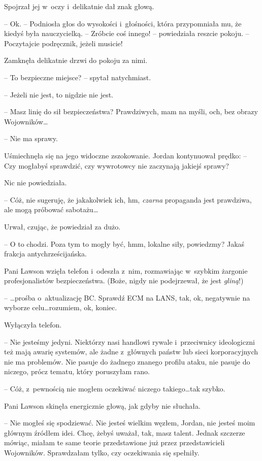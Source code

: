 \documentclass[oneside,polish,11pt,sfheadings]{mwbk}
\begin{document}
Spojrzał jej w~oczy i~delikatnie dał znak głową.

-- Ok. -- Podniosła głos do wysokości i~głośności, która przypomniała mu,
że kiedyś była nauczycielką. -- Zróbcie coś innego! -- powiedziała reszcie
pokoju. -- Poczytajcie podręcznik, jeżeli musicie!

Zamknęła delikatnie drzwi do pokoju za nimi.

-- To bezpieczne miejsce? -- spytał natychmiast.

-- Jeżeli nie jest, to nigdzie nie jest.

-- Masz linię do sił bezpieczeństwa? Prawdziwych, mam na myśli, och, bez
obrazy Wojowników\ldots

-- Nie ma sprawy.

Uśmiechnęła się na jego widoczne zszokowanie. Jordan kontynuował prędko:
-- Czy mogłabyś sprawdzić, czy wywrotowcy nie zaczynają jakiejś sprawy?

Nic nie powiedziała.

-- Cóż, nie sugeruję, że jakakolwiek ich, hm, \emph{czarna} propaganda
jest prawdziwa, ale mogą próbować sabotażu\ldots

Urwał, czując, że powiedział za dużo.

-- O to chodzi. Poza tym to mogły być, hmm, lokalne siły, powiedzmy?
Jakaś frakcja antychrześcijańska.

Pani Lawson wzięła telefon i~odeszła z~nim, rozmawiając w~szybkim
żargonie profesjonalistów bezpieczeństwa. (Boże, nigdy nie podejrzewał,
że jest \emph{gliną}!)

-- \ldots prośba o~aktualizację BC. Sprawdź ECM na LANS, tak, ok, negatywnie
na wyborze celu\ldots rozumiem, ok, koniec.

Wyłączyła telefon.

-- Nie jesteśmy jedyni. Niektórzy nasi handlowi rywale i~przeciwnicy
ideologiczni też mają awarię systemów, ale żadne z~głównych państw lub
sieci korporacyjnych nie ma problemów. Nie pasuje do żadnego znanego
profilu ataku, nie pasuje do niczego, prócz tematu, który poruszyłam
rano.

-- Cóż, z~pewnością nie mogłem oczekiwać niczego takiego\ldots tak szybko.

Pani Lawson skinęła energicznie głową, jak gdyby nie słuchała.

-- Nie mogłeś się spodziewać. Nie jesteś wielkim węzłem, Jordan, nie
jesteś moim głównym źródłem idei. Chcę, żebyś uważał, tak, masz talent.
Jednak szczerze mówiąc, miałam te same teorie przedstawione już przez
przedstawicieli Wojowników. Sprawdzałam tylko, czy oczekiwania się
spełniły.
\end{document}
